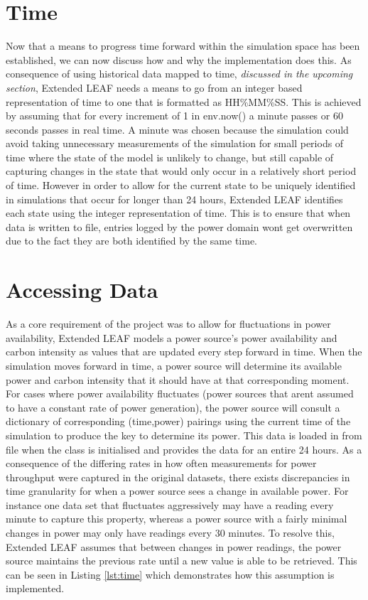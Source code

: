 \documentclass{l4proj}
\begin{document}
\section{Time}\label{imp:subsec:time}
Now that a means to progress time forward within the simulation space has been established, we can now discuss how and why the implementation does this.
As consequence of using historical data mapped to time, \textit{discussed in the upcoming section}, Extended LEAF needs a means to go from an integer based representation of time to one that is formatted as HH\%MM\%SS.
This is achieved by assuming that for every increment of 1 in env.now() a minute passes or 60 seconds passes in real time.
A minute was chosen because the simulation could avoid taking unnecessary measurements of the simulation for small periods of time where the state of the model is unlikely to change, but still capable of capturing changes in the state that would only occur in a relatively short period of time.
However in order to allow for the current state to be uniquely identified in simulations that occur for longer than 24 hours, Extended LEAF identifies each state using the integer representation of time.
This is to ensure that when data is written to file, entries logged by the power domain wont get overwritten due to the fact they are both identified by the same time.

\section{Accessing Data}\label{imp:subsec:daa}

As a core requirement of the project was to allow for fluctuations in power availability, Extended LEAF models a power source's power availability and carbon intensity as values that are updated every step forward in time.
When the simulation moves forward in time, a power source will determine its available power and carbon intensity that it should have at that corresponding moment.
For cases where power availability fluctuates (power sources that arent assumed to have a constant rate of power generation), the power source will consult a dictionary of corresponding (time,power) pairings using the current time of the simulation to produce the key to determine its power.
This data is loaded in from file when the class is initialised and provides the data for an entire 24 hours.
As a consequence of the differing rates in how often measurements for power throughput were captured in the original datasets, there exists discrepancies in time granularity for when a power source sees a change in available power.
For instance one data set that fluctuates aggressively may have a reading every minute to capture this property, whereas a power source with a fairly minimal changes in power may only have readings every 30 minutes.
To resolve this, Extended LEAF assumes that between changes in power readings, the power source maintains the previous rate until a new value is able to be retrieved.
This can be seen in Listing \ref{lst:time} which demonstrates how this assumption is implemented.\\
\end{document}
